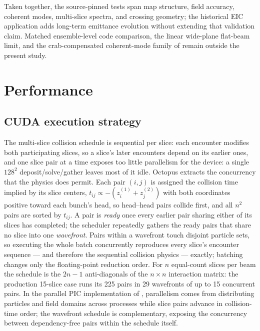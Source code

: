 \documentclass[a4paper,fleqn]{cas-sc}
\begin{document}
Taken together, the source-pinned tests span map structure, field accuracy,
coherent modes, multi-slice spectra, and crossing geometry; the historical EIC
application adds long-term emittance evolution without extending that
validation claim.
Matched ensemble-level code comparison, the linear wide-plane flat-beam limit,
and the crab-compensated coherent-mode family of \citet{OhmiCrossing2017}
remain outside the present study.

\FloatBarrier
\section{Performance}
\label{sec:cuda}

\subsection{CUDA execution strategy}

The multi-slice collision schedule is sequential per slice: each encounter
modifies both participating slices, so a slice's later encounters depend on
its earlier ones, and one slice pair at a time exposes too little
parallelism for the device: a single $128^2$ deposit/solve/gather leaves
most of it idle.
Octopus extracts the concurrency that the physics does permit.  Each pair
$(i,j)$ is assigned the collision time implied by its slice centers,
$t_{ij}\propto-(z^{(1)}_i+z^{(2)}_j)$ with both coordinates positive toward
each bunch's head, so head--head pairs collide first, and all $n^2$ pairs
are sorted by $t_{ij}$.  A pair is \emph{ready} once every earlier pair
sharing either of its slices has completed; the scheduler repeatedly gathers
the ready pairs that share no slice into one \emph{wavefront}.  Pairs within
a wavefront touch disjoint particle sets, so executing the whole batch
concurrently reproduces every slice's encounter sequence --- and therefore
the sequential collision physics --- exactly; batching changes only the
floating-point reduction order.  For $n$ equal-count slices per beam the
schedule is the $2n-1$ anti-diagonals of the $n\times n$ interaction matrix:
the production 15-slice case runs its 225 pairs in 29 wavefronts of up to 15
concurrent pairs.  In the parallel PIC implementation of
\citet{Qiang2004BeamBeam3D}, parallelism comes from distributing particles
and field domains across processes while slice pairs advance in
collision-time order; the wavefront schedule is complementary, exposing the
concurrency between dependency-free pairs within the schedule itself.
\end{document}
